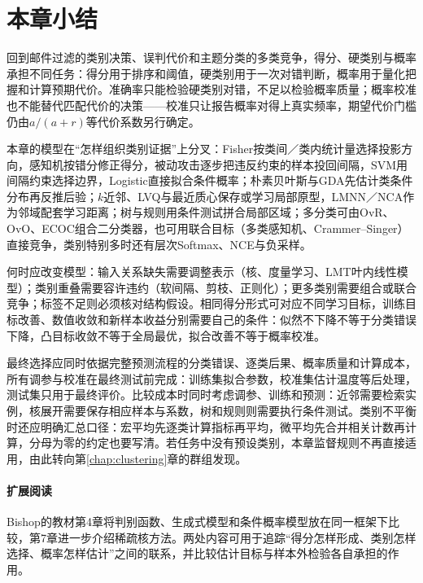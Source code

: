 













\section{本章小结}
\label{sec:classification-summary}

回到邮件过滤的类别决策、误判代价和主题分类的多类竞争，得分、硬类别与概率承担不同任务：得分用于排序和阈值，硬类别用于一次对错判断，概率用于量化把握和计算预期代价。准确率只能检验硬类别对错，不足以检验概率质量；概率校准也不能替代匹配代价的决策——校准只让报告概率对得上真实频率，期望代价门槛仍由$a/(a+r)$等代价系数另行确定。

本章的模型在“怎样组织类别证据”上分叉：Fisher按类间／类内统计量选择投影方向，感知机按错分修正得分，被动攻击逐步把违反约束的样本投回间隔，SVM用间隔约束选择边界，Logistic直接拟合条件概率；朴素贝叶斯与GDA先估计类条件分布再反推后验；$k$近邻、LVQ与最近质心保存或学习局部原型，LMNN／NCA作为邻域配套学习距离；树与规则用条件测试拼合局部区域；多分类可由OvR、OvO、ECOC组合二分类器，也可用联合目标（多类感知机、Crammer–Singer）直接竞争，类别特别多时还有层次Softmax、NCE与负采样。

何时应改变模型：输入关系缺失需要调整表示（核、度量学习、LMT叶内线性模型）；类别重叠需要容许违约（软间隔、剪枝、正则化）；更多类别需要组合或联合竞争；标签不足则必须核对结构假设。相同得分形式可对应不同学习目标，训练目标改善、数值收敛和新样本收益分别需要自己的条件：似然不下降不等于分类错误下降，凸目标收敛不等于全局最优，拟合改善不等于概率校准。

最终选择应同时依据完整预测流程的分类错误、逐类后果、概率质量和计算成本，所有调参与校准在最终测试前完成：训练集拟合参数，校准集估计温度等后处理，测试集只用于最终评价。比较成本时同时考虑调参、训练和预测：近邻需要检索实例，核展开需要保存相应样本与系数，树和规则则需要执行条件测试。类别不平衡时还应明确汇总口径：宏平均先逐类计算指标再平均，微平均先合并相关计数再计算，分母为零的约定也要写清。若任务中没有预设类别，本章监督规则不再直接适用，由此转向第\ref{chap:clustering}章的群组发现。

\paragraph{扩展阅读}
Bishop的教材第4章将判别函数、生成式模型和条件概率模型放在同一框架下比较，第7章进一步介绍稀疏核方法。两处内容可用于追踪“得分怎样形成、类别怎样选择、概率怎样估计”之间的联系，并比较估计目标与样本外检验各自承担的作用。
